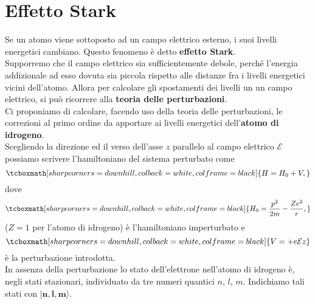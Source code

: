 \chapter[Effetto Stark]{Effetto Stark}
Se un atomo viene sottoposto ad un campo elettrico esterno, i suoi livelli energetici cambiano. Questo fenomeno è detto \textbf{effetto Stark}.\\

Supporremo che il campo elettrico sia sufficientemente debole, perché l'energia addizionale ad esso dovuta sia piccola rispetto alle distanze fra i livelli energetici vicini dell'atomo. Allora per calcolare gli spostamenti dei livelli un un campo elettrico, si può ricorrere alla \textbf{teoria delle perturbazioni}.\\

Ci proponiamo di calcolare, facendo uso della teoria delle perturbazioni, le correzioni al primo ordine da apportare ai livelli energetici dell'\textbf{atomo di idrogeno}.\\

Scegliendo la direzione ed il verso dell'asse $z$ parallelo al campo elettrico $\mathcal{E}$ possiamo scrivere l'hamiltoniano del sistema perturbato come
	\begin{equation}
		\tcboxmath[sharp corners=downhill, colback=white, colframe=black]{
			H=H_0+V, 
			}
	\end{equation}
dove
	\begin{equation}
		\tcboxmath[sharp corners=downhill, colback=white, colframe=black]{
			H_0=\frac{p^2}{2m}-\frac{Ze^2}{r},
			}
	\end{equation}
($Z=1$ per l'atomo di idrogeno) è l'hamiltoniano imperturbato e
	\begin{equation}
		\tcboxmath[sharp corners=downhill, colback=white, colframe=black]{
			V=+e\mathcal{E}z
			}
	\end{equation}
è la perturbazione introdotta.\\

In assenza della perturbazione lo stato dell'elettrone nell'atomo di idrogeno è, negli stati stazionari, individuato da tre numeri quantici $n$, $l$, $m$. Indichiamo tali stati con $\mathbf{|n,l,m\rangle}$.\\

